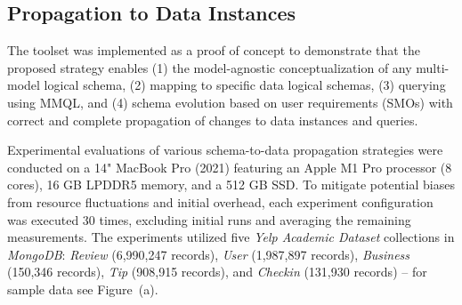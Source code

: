 

\subsection{Propagation to Data Instances}

The toolset was implemented as a proof of concept to demonstrate that the proposed strategy enables (1) the model-agnostic conceptualization of any multi-model logical schema, (2) mapping to specific data logical schemas, (3) querying using MMQL, and (4) schema evolution based on user requirements (SMOs) with correct and complete propagation of changes to data instances and queries.

Experimental evaluations of various schema-to-data propagation strategies were conducted on a 14" MacBook Pro (2021) featuring an Apple M1 Pro processor (8 cores), 16 GB LPDDR5 memory, and a 512 GB SSD. To mitigate potential biases from resource fluctuations and initial overhead, each experiment configuration was executed 30 times, excluding initial runs and averaging the remaining measurements. The experiments utilized five \textit{Yelp Academic Dataset} collections in \textit{MongoDB}: \textit{Review} (6,990,247 records), \textit{User} (1,987,897 records), \textit{Business} (150,346 records), \textit{Tip} (908,915 records), and \textit{Checkin} (131,930 records) -- for sample data see Figure~(a).


